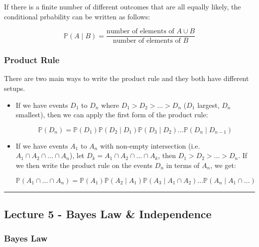 \documentclass{article}
\begin{document}
If there is a finite number of different outcomes that are all equally
likely, the conditional prbability can be written as follows:

\begin{equation}
  \boxed{
    \mathbb{P}(A \mid B) = \frac{\text{number of elements of } A \cup
      B}{\text{number of elements of } B}
  }
\end{equation}

\subsubsection{Product Rule}

There are two main ways to write the product rule and they both have
different setups.

\begin{itemize}
\item If we have events $D_1$ to $D_n$ where $D_1 > D_2 > \dots > D_n$
  ($D_1$ largest, $D_n$ smallest), then we can apply the first form of
  the product rule:

  \begin{equation}
    \tag{Product Rule 1}
    \boxed{
      \mathbb{P}(D_n) = \mathbb{P}(D_1) \mathbb{P}(D_2 \mid D_1)
      \mathbb{P}(D_3 \mid D_2) \dots \mathbb{P}(D_n \mid D_{n-1})
    }
  \end{equation}

\item If we have events $A_1$ to $A_n$ with non-empty intersection
  (i.e. $A_1 \cap A_2 \cap \dots \cap A_n$), let $D_k = A_1 \cap A_2
  \cap \dots \cap A_k$, then $D_1 > D_2 > \dots > D_n$. If we then
  write the product rule on the events $D_n$ in terms of $A_n$, we
  get:

  \begin{equation}
    \tag{Product Rule 2}
    \boxed{
      \mathbb{P}(A_1 \cap \dots \cap A_n) = \mathbb{P}(A_1)
      \mathbb{P}(A_2 \mid A_1) \mathbb{P}(A_3 \mid A_1 \cap A_2) \dots
      \mathbb{P}(A_n \mid A_1 \cap \dots)
    }
  \end{equation}
\end{itemize}


\medskip\hrule
\subsection{Lecture 5 - Bayes Law \& Independence}

\subsubsection{Bayes Law}
\end{document}
